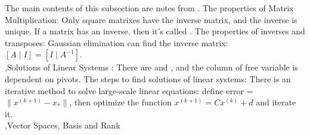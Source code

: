 \documentclass[10pt]{report}
\begin{document}
The main contents of this subsection are notes from \cite{deisenroth2020mathematics}.
The properties of Matrix Multiplication:
Only square matrixes have the inverse matrix, and the inverse is unique. If a matrix has an inverse, then it's called .
The properties of inverses and transposes:
Gaussian elimination can find the inverse matrix: $[A\mid I]=[I\mid A^{-1}]$.\\
\sep{Solutions of Linear Systems}
:
There are  and , and the column of free variable is dependent on pivots. The steps to find solutions of linear systems:
There is an iterative method to solve large-scale linear equations:
define error = $\|x^{(k+1)}-x_*\|$, then optimize the function $x^{(k+1)}=Cx^{(k)}+d$ and iterate it.\\
\sep{Vector Spaces, Basis and Rank}
\end{document}
